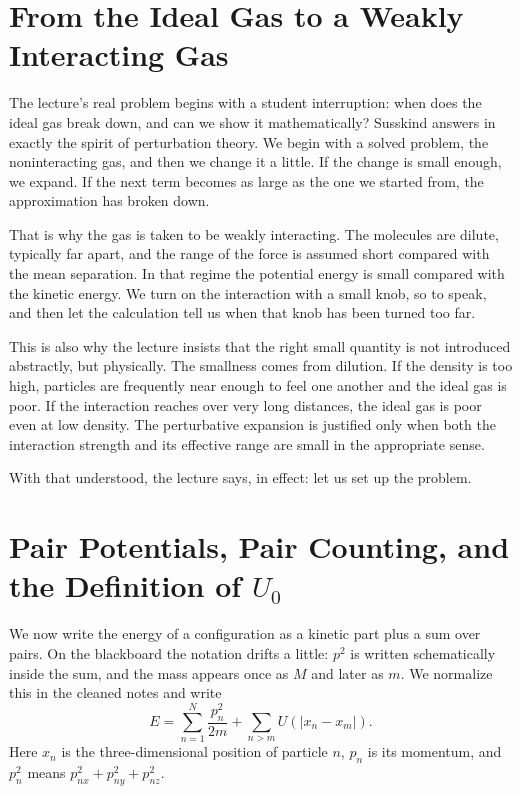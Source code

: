\section{From the Ideal Gas to a Weakly Interacting Gas}

The lecture's real problem begins with a student interruption: when does the ideal gas break down, and can we show it mathematically? Susskind answers in exactly the spirit of perturbation theory. We begin with a solved problem, the noninteracting gas, and then we change it a little. If the change is small enough, we expand. If the next term becomes as large as the one we started from, the approximation has broken down.

That is why the gas is taken to be weakly interacting. The molecules are dilute, typically far apart, and the range of the force is assumed short compared with the mean separation. In that regime the potential energy is small compared with the kinetic energy. We turn on the interaction with a small knob, so to speak, and then let the calculation tell us when that knob has been turned too far.

This is also why the lecture insists that the right small quantity is not introduced abstractly, but physically. The smallness comes from dilution. If the density is too high, particles are frequently near enough to feel one another and the ideal gas is poor. If the interaction reaches over very long distances, the ideal gas is poor even at low density. The perturbative expansion is justified only when both the interaction strength and its effective range are small in the appropriate sense.

With that understood, the lecture says, in effect: let us set up the problem.

\section{Pair Potentials, Pair Counting, and the Definition of \(U_0\)}

We now write the energy of a configuration as a kinetic part plus a sum over pairs. On the blackboard the notation drifts a little: \(p^2\) is written schematically inside the sum, and the mass appears once as \(M\) and later as \(m\). We normalize this in the cleaned notes and write
\begin{equation}
E=\sum_{n=1}^{N}\frac{p_n^2}{2m}+\sum_{n>m}U\!\left(|x_n-x_m|\right).
\end{equation}
Here \(x_n\) is the three-dimensional position of particle \(n\), \(p_n\) is its momentum, and \(p_n^2\) means \(p_{nx}^2+p_{ny}^2+p_{nz}^2\).

